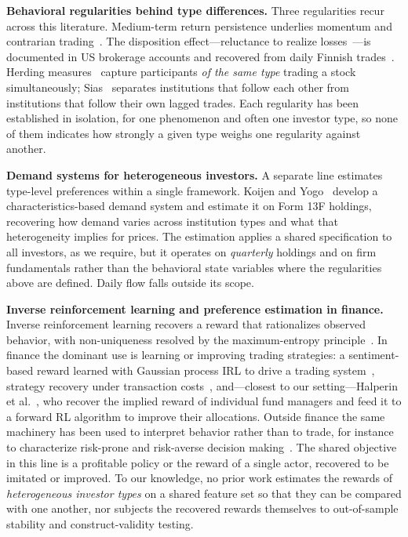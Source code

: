 \documentclass[sigconf,anonymous,review]{acmart}
\begin{document}
\textbf{Behavioral regularities behind type differences.} Three
regularities recur across this literature. Medium-term return
persistence underlies momentum and contrarian
trading~\cite{jegadeesh_titman}. The disposition effect---reluctance to
realize losses~\cite{shefrin_statman,odean1998}---is documented in US
brokerage accounts and recovered from daily Finnish
trades~\cite{grinblatt_keloharju2001}. Herding
measures~\cite{lakonishok_shleifer_vishny} capture participants
\emph{of the same type} trading a stock simultaneously;
Sias~\cite{sias2004} separates institutions that follow each other from
institutions that follow their own lagged trades. Each regularity has
been established in isolation, for one phenomenon and often one investor
type, so none of them indicates how strongly a given type weighs one
regularity against another.

\textbf{Demand systems for heterogeneous investors.} A separate line
estimates type-level preferences within a single framework. Koijen and
Yogo~\cite{koijen_yogo2019} develop a characteristics-based demand system
and estimate it on Form 13F holdings, recovering how demand varies across
institution types and what that heterogeneity implies for prices. The
estimation applies a shared specification to all investors, as we
require, but
it operates on \emph{quarterly} holdings and on firm fundamentals rather
than the behavioral state variables where the regularities above are
defined. Daily flow falls outside its scope.

\textbf{Inverse reinforcement learning and preference estimation in
finance.} Inverse reinforcement learning recovers a reward that
rationalizes observed behavior, with non-uniqueness resolved by the
maximum-entropy principle~\cite{ziebart2008}. In finance the dominant use is
learning or improving trading strategies: a sentiment-based reward
learned with Gaussian process IRL to drive a trading
system~\cite{yang2018gpirl}, strategy recovery under transaction
costs~\cite{sun2023transaction}, and---closest to our setting---Halperin
et al.~\cite{halperin2022}, who recover the implied reward of individual
fund managers and feed it to a forward RL algorithm to improve their
allocations. Outside finance the same machinery has been used to
interpret behavior rather than to trade, for instance to characterize
risk-prone and risk-averse decision making~\cite{liu2019risk}. The shared objective in this line is a profitable policy or
the reward of a single actor, recovered to be imitated or improved. To our knowledge, no prior work estimates the rewards of
\emph{heterogeneous investor types} on a shared feature set so that they
can be compared with one another, nor subjects the recovered rewards
themselves to out-of-sample stability and construct-validity testing.
\end{document}
